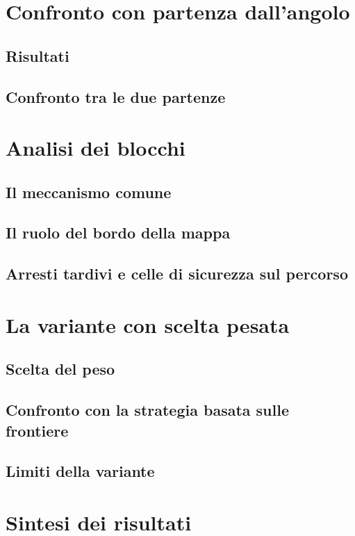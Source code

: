 \section{Confronto con partenza dall'angolo}
\label{sec:risultati_angolo}

\subsection{Risultati}
\label{sec:angolo_risultati}


\subsection{Confronto tra le due partenze}
\label{sec:angolo_confronto}


\section{Analisi dei blocchi}
\label{sec:blocchi}

\subsection{Il meccanismo comune}
\label{sec:meccanismo}


\subsection{Il ruolo del bordo della mappa}
\label{sec:bordo}


\subsection{Arresti tardivi e celle di sicurezza sul percorso}
\label{sec:arresti_tardivi}


\section{La variante con scelta pesata}
\label{sec:risultati_pesata}

\subsection{Scelta del peso}
\label{sec:taratura}


\subsection{Confronto con la strategia basata sulle frontiere}
\label{sec:confronto_pesata}


\subsection{Limiti della variante}
\label{sec:limiti_pesata}


\section{Sintesi dei risultati}
\label{sec:sintesi}

